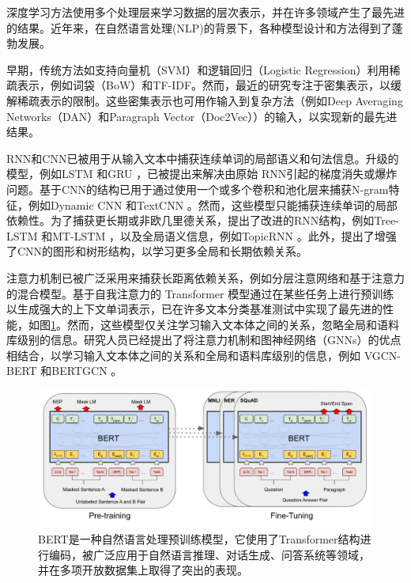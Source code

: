 深度学习方法使用多个处理层来学习数据的层次表示，并在许多领域产生了最先进的结果。近年来，在自然语言处理(NLP)的背景下，各种模型设计和方法得到了蓬勃发展。

早期，传统方法如支持向量机（SVM）\cite{zhang2011comparative}和逻辑回归（Logistic Regression）\cite{genkin2007large}利用稀疏表示，例如词袋（BoW）和TF-IDF。然而，最近的研究专注于密集表示，以缓解稀疏表示的限制。这些密集表示也可用作输入到复杂方法（例如Deep Averaging Networks（DAN）\cite{iyyer2015deep}和Paragraph Vector（Doc2Vec）\cite{le2014distributed}）的输入，以实现新的最先进结果。

RNN和CNN已被用于从输入文本中捕获连续单词的局部语义和句法信息。升级的模型，例如LSTM \cite{graves2012long}和GRU \cite{cho2014learning}，已被提出来解决由原始 RNN引起的梯度消失或爆炸问题。基于CNN的结构已用于通过使用一个或多个卷积和池化层来捕获N-gram特征，例如Dynamic CNN \cite{kalchbrenner2014convolutional}和TextCNN \cite{kim2014convolutional}。然而，这些模型只能捕获连续单词的局部依赖性。为了捕获更长期或非欧几里德关系，提出了改进的RNN结构，例如Tree-LSTM \cite{tai2015improved}和MT-LSTM \cite{liu2015multi}，以及全局语义信息，例如TopicRNN \cite{dieng2016topicrnn}。此外，提出了增强了CNN的图形\cite{peng2018large}和树形结构\cite{mou2015natural}，以学习更多全局和长期依赖关系。

注意力机制\cite{bahdanau2014neural}已被广泛采用来捕获长距离依赖关系，例如分层注意网络\cite{abreu2019hierarchical}和基于注意力的混合模型\cite{yang2016hierarchical}。基于自我注意力的 Transformer 模型通过在某些任务上进行预训练以生成强大的上下文单词表示，已在许多文本分类基准测试中实现了最先进的性能，如图\ref{fig:bert}。然而，这些模型仅关注学习输入文本体之间的关系，忽略全局和语料库级别的信息。研究人员已经提出了将注意力机制和图神经网络（GNNs）的优点相结合，以学习输入文本体之间的关系和全局和语料库级别的信息，例如 VGCN-BERT \cite{VGCNBERT2020}和BERTGCN \cite{BERTGCN2021}。


\begin{figure}[ht]
	\centering
    \includegraphics[width=0.95\linewidth]{figures/bert.png}
	\caption{BERT是一种自然语言处理预训练模型，它使用了Transformer结构进行编码，被广泛应用于自然语言推理、对话生成、问答系统等领域，并在多项开放数据集上取得了突出的表现。}
    \label{fig:bert}
\end{figure}



